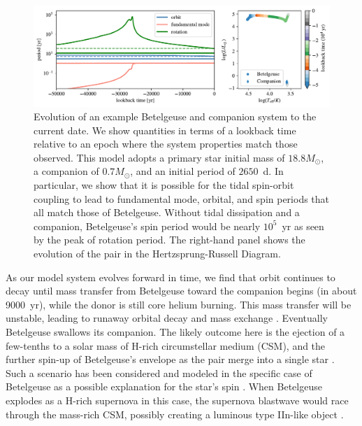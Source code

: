 \documentclass[twocolumn]{aastex631}
\begin{document}
\begin{figure}
    \centering
    \includegraphics[width=\textwidth]{figures/mesa_combined.pdf}
    \caption{Evolution of an example Betelgeuse and companion system to the current date. We show quantities in terms of a lookback time relative to an epoch where the system properties match those observed. This model adopts a primary star initial mass of $18.8 M_\odot$, a companion of $0.7M_\odot$, and an initial period of $2650$~d. In particular, we show that it is possible for the tidal spin-orbit coupling to lead to  fundamental mode, orbital, and spin periods that all match those of Betelgeuse. Without tidal dissipation and a companion, Betelgeuse's spin period would be nearly $10^{5}$~yr as seen by the peak of rotation period. The right-hand panel shows the evolution of the pair in the Hertzsprung-Russell Diagram.   }
    \label{fig:mesa}
\end{figure}

As our model system evolves forward in time, we find that orbit continues to decay until mass transfer from Betelgeuse toward the companion begins (in about 9000~yr), while the donor is still core helium burning. This mass transfer will be unstable, leading to runaway orbital decay and mass exchange \citep[e.g.][]{2018ApJ...863....5M,2020ApJ...893..106M}.  Eventually Betelgeuse swallows its companion. The likely outcome here is the ejection of a few-tenths to a solar mass of H-rich circumstellar medium (CSM), and the further spin-up of Betelgeuse's envelope as the pair merge into a single star \citep{2006MNRAS.373..733S,2024ApJ...962..168S}. Such a scenario has been considered and modeled in the specific case of Betelgeuse as a possible explanation for the star's spin \citep{2017MNRAS.465.2654W,2020ApJ...905..128S,2024ApJ...962..168S}.  When Betelgeuse explodes as a H-rich supernova in this case, the supernova blastwave would race through the mass-rich CSM, possibly creating a luminous type IIn-like object \citep{2020ApJ...892...13S,2020ApJ...891...15G,2022ApJ...933..164G,2024ApJ...962..168S}. 
\end{document}
